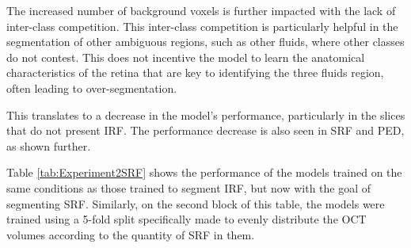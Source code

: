 \par
The increased number of background voxels is further impacted with the lack of inter-class competition. This inter-class competition is particularly helpful in the segmentation of other ambiguous regions, such as other fluids, where other classes do not contest. This does not incentive the model to learn the anatomical characteristics of the retina that are key to identifying the three fluids region, often leading to over-segmentation. 
\par
This translates to a decrease in the model's performance, particularly in the slices that do not present IRF. The performance decrease is also seen in SRF and PED, as shown further.
\par
Table \ref{tab:Experiment2SRF} shows the performance of the models trained on the same conditions as those trained to segment IRF, but now with the goal of segmenting SRF. Similarly, on the second block of this table, the models were trained using a 5-fold split specifically made to evenly distribute the OCT volumes according to the quantity of SRF in them.


